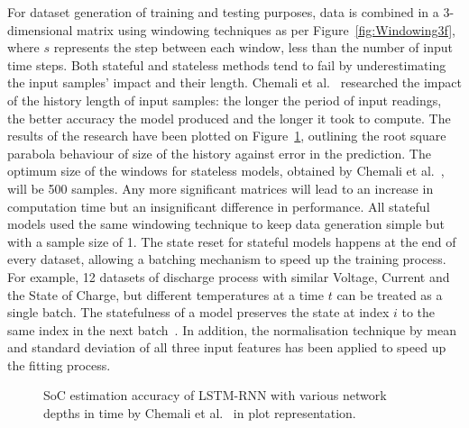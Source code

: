 %
%
For dataset generation of training and testing purposes, data is combined in a 3-dimensional matrix using windowing techniques as per \mbox{Figure~\ref{fig:Windowing3f}}, where $s$ represents the step between each window, less than the number of input time steps.
Both stateful and stateless methods tend to fail by underestimating the input samples' impact and their length.
Chemali et al.~\cite{Chemali2017} researched the impact of the history length of input samples: the longer the period of input readings, the better accuracy the model produced and the longer it took to compute.
The results of the research have been plotted on \mbox{Figure~\ref{fig:chemali-accuracy}}, outlining the root square parabola behaviour of size of the history against error in the prediction.
The optimum size of the windows for stateless models, obtained by Chemali et al.~\cite{Chemali2017}, will be 500 samples.
Any more significant matrices will lead to an increase in computation time but an insignificant difference in performance.
All stateful models used the same windowing technique to keep data generation simple but with a sample size of 1.
The state reset for stateful models happens at the end of every dataset, allowing a batching mechanism to speed up the training process.
For example, 12 datasets of discharge process with similar Voltage, Current and the State of Charge, but different temperatures at a time $t$ can be treated as a single batch.
The statefulness of a model preserves the state at index $i$ to the same index in the next batch~\cite{zhu_statefulnes_tfdocs_2020}.
In addition, the normalisation technique by mean and standard deviation of all three input features has been applied to speed up the fitting process.
\begin{figure}[htbp]
    \centering
    
    \caption{SoC estimation accuracy of LSTM-RNN with various network depths in time by Chemali et al.~\cite{Chemali2017} in plot representation.}
    \label{fig:chemali-accuracy}
\end{figure}
